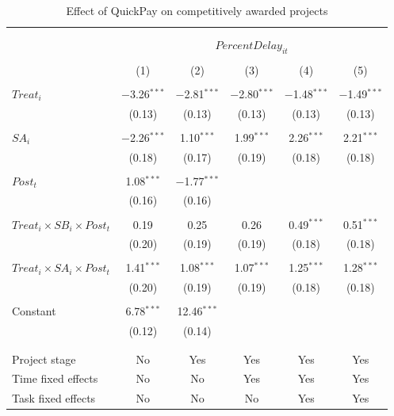 \documentclass[
]{article}
\begin{document}
\begin{table}[H] \centering 
  \caption{Effect of QuickPay on competitively awarded projects} 
  \label{} 
\small 
\begin{tabular}{@{\extracolsep{-2pt}}lccccc} 
\\[-1.8ex]\hline 
\hline \\[-1.8ex] 
\\[-1.8ex] & \multicolumn{5}{c}{$PercentDelay_{it}$  } \\ 
\\[-1.8ex] & (1) & (2) & (3) & (4) & (5)\\ 
\hline \\[-1.8ex] 
 $Treat_i$ & $-$3.26$^{***}$ & $-$2.81$^{***}$ & $-$2.80$^{***}$ & $-$1.48$^{***}$ & $-$1.49$^{***}$ \\ 
  & (0.13) & (0.13) & (0.13) & (0.13) & (0.13) \\ 
  & & & & & \\ 
 $SA_i$ & $-$2.26$^{***}$ & 1.10$^{***}$ & 1.99$^{***}$ & 2.26$^{***}$ & 2.21$^{***}$ \\ 
  & (0.18) & (0.17) & (0.19) & (0.18) & (0.18) \\ 
  & & & & & \\ 
 $Post_t$ & 1.08$^{***}$ & $-$1.77$^{***}$ &  &  &  \\ 
  & (0.16) & (0.16) &  &  &  \\ 
  & & & & & \\ 
 $Treat_i \times SB_i \times Post_t$ & 0.19 & 0.25 & 0.26 & 0.49$^{***}$ & 0.51$^{***}$ \\ 
  & (0.20) & (0.19) & (0.19) & (0.18) & (0.18) \\ 
  & & & & & \\ 
 $Treat_i \times SA_i \times Post_t$ & 1.41$^{***}$ & 1.08$^{***}$ & 1.07$^{***}$ & 1.25$^{***}$ & 1.28$^{***}$ \\ 
  & (0.20) & (0.19) & (0.19) & (0.18) & (0.18) \\ 
  & & & & & \\ 
 Constant & 6.78$^{***}$ & 12.46$^{***}$ &  &  &  \\ 
  & (0.12) & (0.14) &  &  &  \\ 
  & & & & & \\ 
\hline \\[-1.8ex] 
Project stage & No & Yes & Yes & Yes & Yes \\ 
Time fixed effects & No & No & Yes & Yes & Yes \\ 
Task fixed effects & No & No & No & Yes & Yes \\ 

\end{tabular}
\end{table}
\end{document}
